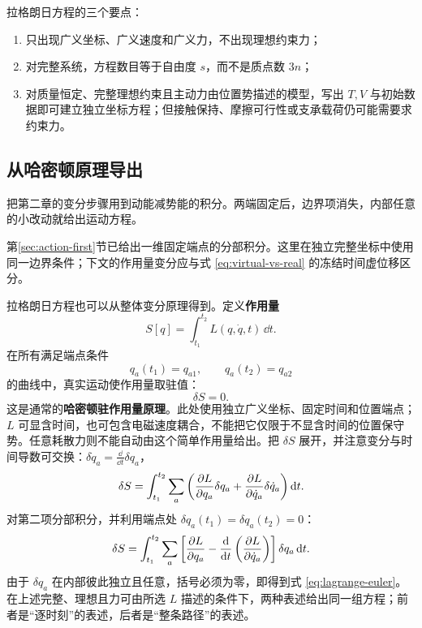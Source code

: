 \begin{keybox}
拉格朗日方程的三个要点：
\begin{enumerate}[leftmargin=1.6em]
  \item 只出现广义坐标、广义速度和广义力，不出现理想约束力；
  \item 对完整系统，方程数目等于自由度 $s$，而不是质点数 $3n$；
  \item 对质量恒定、完整理想约束且主动力由位置势描述的模型，写出 $T,V$ 与初始数据即可建立独立坐标方程；但接触保持、摩擦可行性或支承载荷仍可能需要求约束力。
\end{enumerate}
\end{keybox}

\subsection{从哈密顿原理导出}\label{sec:ham-principle}
把第二章的变分步骤用到动能减势能的积分。两端固定后，边界项消失，内部任意的小改动就给出运动方程。

第\ref{sec:action-first}节已给出一维固定端点的分部积分。这里在独立完整坐标中使用同一边界条件；下文的作用量变分应与式 \eqref{eq:virtual-vs-real} 的冻结时间虚位移区分。

拉格朗日方程也可以从整体变分原理得到。定义\textbf{作用量}
\begin{equation}
S[q]=\int_{t_1}^{t_2}L(q,\dot q,t)\,\dd t.
\label{eq:action}
\end{equation}
在所有满足端点条件
\[
q_a(t_1)=q_{a1},\qquad q_a(t_2)=q_{a2}
\]
的曲线中，真实运动使作用量取驻值：
\begin{equation}
\delta S=0.
\label{eq:hamilton-principle-lagrange}
\end{equation}
这是通常的\textbf{哈密顿驻作用量原理}。此处使用独立广义坐标、固定时间和位置端点；$L$ 可显含时间，也可包含电磁速度耦合，不能把它仅限于不显含时间的位置保守势。任意耗散力则不能自动由这个简单作用量给出。把 $\delta S$ 展开，并注意变分与时间导数可交换：$\delta\dot q_a=\frac{\dd}{\dd t}\delta q_a$，
\[
\delta S=\int_{t_1}^{t_2}\sum_a
\left(\frac{\partial L}{\partial q_a}\delta q_a+\frac{\partial L}{\partial \dot q_a}\delta\dot q_a\right)\mathrm{d} t.
\]
对第二项分部积分，并利用端点处 $\delta q_a(t_1)=\delta q_a(t_2)=0$：
\[
\delta S=\int_{t_1}^{t_2}\sum_a
\left[\frac{\partial L}{\partial q_a}-\frac{\mathrm{d}}{\mathrm{d} t}\left(\frac{\partial L}{\partial \dot q_a}\right)\right]\delta q_a\,\mathrm{d} t.
\]
由于 $\delta q_a$ 在内部彼此独立且任意，括号必须为零，即得到式 \eqref{eq:lagrange-euler}。在上述完整、理想且力可由所选 $L$ 描述的条件下，两种表述给出同一组方程；前者是“逐时刻”的表述，后者是“整条路径”的表述。

